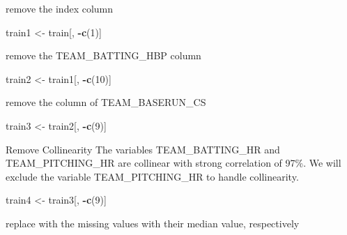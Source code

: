\documentclass[]{article}
\newenvironment{Shaded}{\begin{snugshade}}{\end{snugshade}}
\newcommand{\KeywordTok}[1]{\textcolor[rgb]{0.13,0.29,0.53}{\textbf{#1}}}
\newcommand{\DecValTok}[1]{\textcolor[rgb]{0.00,0.00,0.81}{#1}}
\newcommand{\StringTok}[1]{\textcolor[rgb]{0.31,0.60,0.02}{#1}}
\newcommand{\OperatorTok}[1]{\textcolor[rgb]{0.81,0.36,0.00}{\textbf{#1}}}
\newcommand{\NormalTok}[1]{#1}
\begin{document}
remove the index column

\begin{Shaded}
\begin{Highlighting}[]
\NormalTok{train1 <-}\StringTok{ }\NormalTok{train[, }\OperatorTok{-}\KeywordTok{c}\NormalTok{(}\DecValTok{1}\NormalTok{)]}
\end{Highlighting}
\end{Shaded}

remove the TEAM\_BATTING\_HBP column

\begin{Shaded}
\begin{Highlighting}[]
\NormalTok{train2 <-}\StringTok{ }\NormalTok{train1[, }\OperatorTok{-}\KeywordTok{c}\NormalTok{(}\DecValTok{10}\NormalTok{)]}
\end{Highlighting}
\end{Shaded}

remove the column of TEAM\_BASERUN\_CS

\begin{Shaded}
\begin{Highlighting}[]
\NormalTok{train3 <-}\StringTok{ }\NormalTok{train2[, }\OperatorTok{-}\KeywordTok{c}\NormalTok{(}\DecValTok{9}\NormalTok{)]}
\end{Highlighting}
\end{Shaded}

Remove Collinearity The variables TEAM\_BATTING\_HR and
TEAM\_PITCHING\_HR are collinear with strong correlation of 97\%. We
will exclude the variable TEAM\_PITCHING\_HR to handle collinearity.

\begin{Shaded}
\begin{Highlighting}[]
\NormalTok{train4 <-}\StringTok{ }\NormalTok{train3[, }\OperatorTok{-}\KeywordTok{c}\NormalTok{(}\DecValTok{9}\NormalTok{)]}
\end{Highlighting}
\end{Shaded}

replace with the missing values with their median value, respectively
\end{document}
